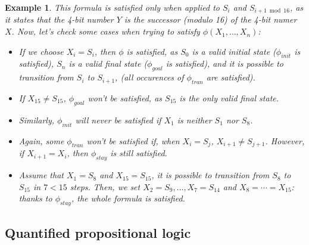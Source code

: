 \documentclass{article}
\theoremstyle{example}
\newtheorem{example}{Example}
\theoremstyle{remark}
\begin{document}
\begin{example}
	\noindent This formula is satisfied only when applied to \(S_{i}\) and \(S_{i+1 \bmod 16}\), as
	it states that the 4-bit number \(Y\) is the successor (modulo 16) of the 4-bit numer \(X\).
	Now, let's check some cases when trying to satisfy \(\phi\left(X_1, \dots, X_n\right)\):
	\begin{itemize}
		\item If we choose \(X_i = S_i\), then \(\phi \) is satisfied, as \(S_0\) is
		      a valid initial state (\(\phi_{init}\) is satisfied), \(S_n\) is a valid final state
		      (\(\phi_{goal}\) is satisfied), and it is possible to transition from \(S_i\) to
		      \(S_{i+1}\), (all occurences of \(\phi_{tran}\) are satisfied).
		\item If \(X_{15} \neq S_{15}\), \(\phi_{goal}\) won't be satisfied,
		      as \(S_{15}\) is the only valid final state.
		\item Similarly, \(\phi_{init}\) will never be satisfied if \(X_1\) is neither \(S_1\)
		      nor \(S_8\).
		\item Again, some \(\phi_{tran}\) won't be satisfied if, when \(X_{i} = S_{j}\),
		      \(X_{i+1} \neq S_{j+1}\).
		      However, if \(X_{i+1} = X_{i}\), then \(\phi_{stay}\) is still satisfied.
		\item Assume that \(X_1 = S_8\) and \(X_{15} = S_{15}\), it is possible to transition from 
					\(S_8\) to \(S_{15}\) in \(7 < 15\) steps.
		      Then, we set \(X_2 = S_9, \dots, X_7 = S_{14}\) and \(X_8 = \cdots = X_{15}\):
		      thanks to \(\phi_{stay}\), the whole formula is satisfied.
	\end{itemize}
\end{example}

\subsection{Quantified propositional logic}
\end{document}
